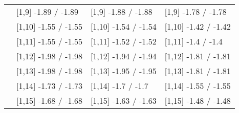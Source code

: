 \begin{table}
\begin{tabular}[t]{llll}
 & {}[1,9] -1.89  / -1.89 & {}[1,9] -1.88  / -1.88 & {}[1,9] -1.78  / -1.78\\
 & {}[1,10] -1.55  / -1.55 & {}[1,10] -1.54  / -1.54 & {}[1,10] -1.42  / -1.42\\
 & {}[1,11] -1.55  / -1.55 & {}[1,11] -1.52  / -1.52 & {}[1,11] -1.4  / -1.4\\
 & {}[1,12] -1.98  / -1.98 & {}[1,12] -1.94  / -1.94 & {}[1,12] -1.81  / -1.81\\
\addlinespace
 & {}[1,13] -1.98  / -1.98 & {}[1,13] -1.95  / -1.95 & {}[1,13] -1.81  / -1.81\\
 & {}[1,14] -1.73  / -1.73 & {}[1,14] -1.7  / -1.7 & {}[1,14] -1.55  / -1.55\\
 & {}[1,15] -1.68  / -1.68 & {}[1,15] -1.63  / -1.63 & {}[1,15] -1.48  / -1.48\\
\bottomrule
\end{tabular}
\end{table}
